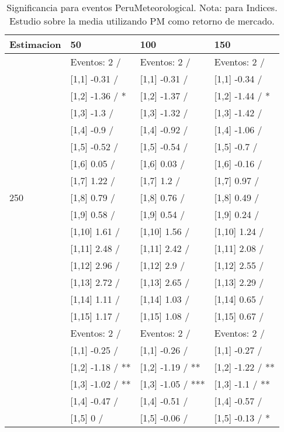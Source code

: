 \begin{table}

\caption{Significancia para eventos PeruMeteorological. Nota: para Indices. Estudio sobre la media utilizando PM como retorno de mercado.}
\centering
\begin{tabular}[t]{llll}
\toprule
Estimacion & 50 & 100 & 150\\
\midrule
 & Eventos:  2 / & Eventos:  2 / & Eventos:  2 /\\
 & {}[1,1] -0.31  / & {}[1,1] -0.31  / & {}[1,1] -0.34  /\\
 & {}[1,2] -1.36  / * & {}[1,2] -1.37  / & {}[1,2] -1.44  / *\\
 & {}[1,3] -1.3  / & {}[1,3] -1.32  / & {}[1,3] -1.42  /\\
 & {}[1,4] -0.9  / & {}[1,4] -0.92  / & {}[1,4] -1.06  /\\
\addlinespace
 & {}[1,5] -0.52  / & {}[1,5] -0.54  / & {}[1,5] -0.7  /\\
 & {}[1,6] 0.05  / & {}[1,6] 0.03  / & {}[1,6] -0.16  /\\
 & {}[1,7] 1.22  / & {}[1,7] 1.2  / & {}[1,7] 0.97  /\\
250 & {}[1,8] 0.79  / & {}[1,8] 0.76  / & {}[1,8] 0.49  /\\
 & {}[1,9] 0.58  / & {}[1,9] 0.54  / & {}[1,9] 0.24  /\\
\addlinespace
 & {}[1,10] 1.61  / & {}[1,10] 1.56  / & {}[1,10] 1.24  /\\
 & {}[1,11] 2.48  / & {}[1,11] 2.42  / & {}[1,11] 2.08  /\\
 & {}[1,12] 2.96  / & {}[1,12] 2.9  / & {}[1,12] 2.55  /\\
 & {}[1,13] 2.72  / & {}[1,13] 2.65  / & {}[1,13] 2.29  /\\
 & {}[1,14] 1.11  / & {}[1,14] 1.03  / & {}[1,14] 0.65  /\\
\addlinespace
 & {}[1,15] 1.17  / & {}[1,15] 1.08  / & {}[1,15] 0.67  /\\
 & Eventos:  2 / & Eventos:  2 / & Eventos:  2 /\\
 & {}[1,1] -0.25  / & {}[1,1] -0.26  / & {}[1,1] -0.27  /\\
 & {}[1,2] -1.18  / ** & {}[1,2] -1.19  / ** & {}[1,2] -1.22  / **\\
 & {}[1,3] -1.02  / ** & {}[1,3] -1.05  / *** & {}[1,3] -1.1  / **\\
\addlinespace
 & {}[1,4] -0.47  / & {}[1,4] -0.51  / & {}[1,4] -0.57  /\\
 & {}[1,5] 0  / & {}[1,5] -0.06  / & {}[1,5] -0.13  / *\\

\end{tabular}
\end{table}
